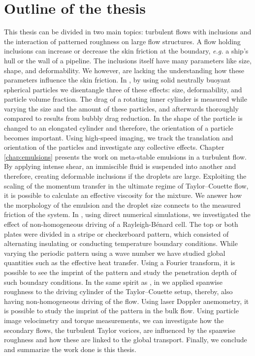 \section*{Outline of the thesis}
This thesis can be divided in two main topics: turbulent flows with inclusions
and the interaction of patterned roughness on large flow structures.
A flow holding inclusions can increase or decrease the skin friction at the
boundary, \textit{e.g.} a ship's hull or the wall of a pipeline.
The inclusions itself have many parameters like size, shape, and
deformability.
We however, are lacking the understanding how these parameters
influence the skin friction.
In , by using solid neutrally buoyant spherical
particles we disentangle three of these effects: size, deformability, and
particle volume fraction.
The drag of a rotating inner cylinder is measured while varying the size and
the amount of these particles, and afterwards thoroughly compared to results
from bubbly drag reduction.
In  the shape of the particle is changed to an elongated
cylinder and therefore, the orientation of a particle becomes important.
Using high-speed imaging, we track the translation and orientation
of the particles and investigate any collective effects.
Chapter\,\ref{chap:emulsions} presents the work on meta-stable emulsions in a
turbulent flow.
By applying intense shear, an immiscible fluid is suspended into another
and therefore, creating deformable inclusions if the droplets are large.
Exploiting the scaling of the momentum transfer in the ultimate regime of
Taylor--Couette flow, it is possible to calculate an effective viscosity for
the mixture.
We answer how the morphology of the emulsion and the droplet size connects to
the measured friction of the system.
In , using direct numerical simulations, we investigated the effect of 
non-homogeneous driving of a Rayleigh-B\'enard cell.
The top or both plates were divided in a stripe or checkerboard pattern,
which consisted of alternating insulating or conducting temperature boundary
conditions.
While varying the periodic pattern using a wave number we have studied global
quantities such as the effective heat transfer.
Using a Fourier transform, it is possible to see the imprint of the pattern
and study the penetration depth of such boundary conditions.
In the same spirit as , in  we applied
spanwise roughness to the driving cylinder of the Taylor--Couette setup,
thereby, also having non-homogeneous driving of the flow.
Using laser Doppler anemometry, it is possible to study the imprint of
the pattern in the bulk flow.
Using particle image velocimetry and torque measurements, we can investigate
how the secondary flows,  the turbulent Taylor vorices, are
influenced by the spanwise roughness and how these are linked to the global
transport.
Finally, we conclude and summarize the work done is this thesis.

